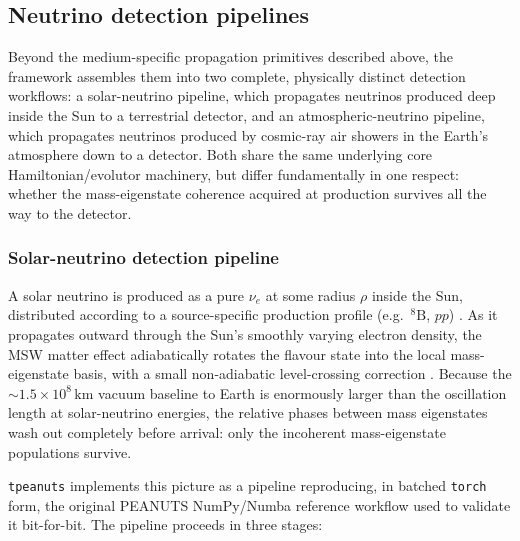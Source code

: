 \subsection{Neutrino detection pipelines}
\label{sec:pipelines}

Beyond the medium-specific propagation primitives described above, the framework assembles them into two complete, physically distinct detection workflows: a solar-neutrino pipeline, which propagates neutrinos produced deep inside the Sun to a terrestrial detector, and an atmospheric-neutrino pipeline, which propagates neutrinos produced by cosmic-ray air showers in the Earth's atmosphere down to a detector. Both share the same underlying core Hamiltonian/evolutor machinery, but differ fundamentally in one respect: whether the mass-eigenstate coherence acquired at production survives all the way to the detector.

\subsubsection{Solar-neutrino detection pipeline}

A solar neutrino is produced as a pure \(\nu_e\) at some radius \(\rho\) inside the Sun, distributed according to a source-specific production profile (e.g.\ \({}^8\mathrm{B}\), \(pp\)) \parencite{Vinyoles2017}. As it propagates outward through the Sun's smoothly varying electron density, the MSW matter effect adiabatically rotates the flavour state into the local mass-eigenstate basis, with a small non-adiabatic level-crossing correction \parencite{Parke1986}. Because the \(\sim1.5\times10^{8}\,\mathrm{km}\) vacuum baseline to Earth is enormously larger than the oscillation length at solar-neutrino energies, the relative phases between mass eigenstates wash out completely before arrival: only the incoherent mass-eigenstate populations survive.

\texttt{tpeanuts} implements this picture as a pipeline reproducing, in batched \texttt{torch} form, the original PEANUTS NumPy/Numba reference workflow used to validate it bit-for-bit. The pipeline proceeds in three stages:

